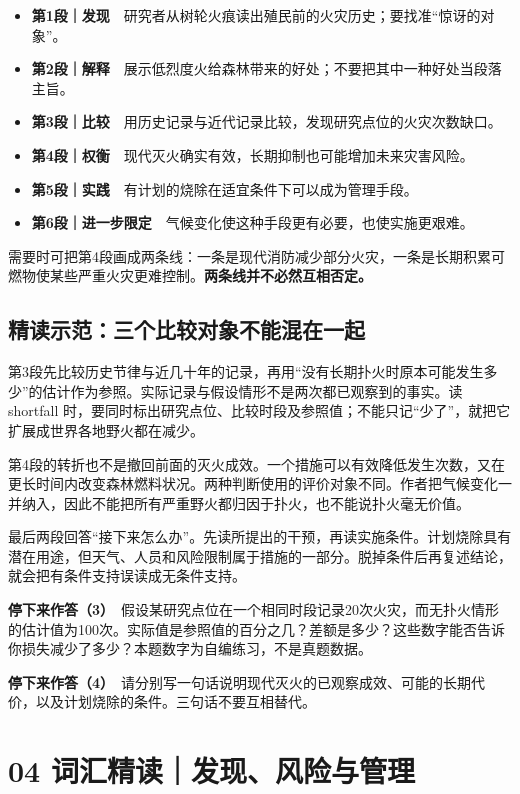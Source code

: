 \documentclass[a4paper,11pt,openany]{report}
\providecommand{\tightlist}{\setlength{\itemsep}{1pt}\setlength{\parskip}{0pt}}
\begin{document}
\begin{itemize}
\tightlist
\item
  \textbf{第1段｜发现}　研究者从树轮火痕读出殖民前的火灾历史；要找准``惊讶的对象''。
\item
  \textbf{第2段｜解释}　展示低烈度火给森林带来的好处；不要把其中一种好处当段落主旨。
\item
  \textbf{第3段｜比较}　用历史记录与近代记录比较，发现研究点位的火灾次数缺口。
\item
  \textbf{第4段｜权衡}　现代灭火确实有效，长期抑制也可能增加未来灾害风险。
\item
  \textbf{第5段｜实践}　有计划的烧除在适宜条件下可以成为管理手段。
\item
  \textbf{第6段｜进一步限定}　气候变化使这种手段更有必要，也使实施更艰难。
\end{itemize}

需要时可把第4段画成两条线：一条是现代消防减少部分火灾，一条是长期积累可燃物使某些严重火灾更难控制。\textbf{两条线并不必然互相否定。}

\subsection{精读示范：三个比较对象不能混在一起}\label{ux7cbeux8bfbux793aux8303ux4e09ux4e2aux6bd4ux8f83ux5bf9ux8c61ux4e0dux80fdux6df7ux5728ux4e00ux8d77}

第3段先比较历史节律与近几十年的记录，再用``没有长期扑火时原本可能发生多少''的估计作为参照。实际记录与假设情形不是两次都已观察到的事实。读 shortfall 时，要同时标出研究点位、比较时段及参照值；不能只记``少了''，就把它扩展成世界各地野火都在减少。

第4段的转折也不是撤回前面的灭火成效。一个措施可以有效降低发生次数，又在更长时间内改变森林燃料状况。两种判断使用的评价对象不同。作者把气候变化一并纳入，因此不能把所有严重野火都归因于扑火，也不能说扑火毫无价值。

最后两段回答``接下来怎么办''。先读所提出的干预，再读实施条件。计划烧除具有潜在用途，但天气、人员和风险限制属于措施的一部分。脱掉条件后再复述结论，就会把有条件支持误读成无条件支持。

\textbf{停下来作答（3）}　假设某研究点位在一个相同时段记录20次火灾，而无扑火情形的估计值为100次。实际值是参照值的百分之几？差额是多少？这些数字能否告诉你损失减少了多少？本题数字为自编练习，不是真题数据。

\textbf{停下来作答（4）}　请分别写一句话说明现代灭火的已观察成效、可能的长期代价，以及计划烧除的条件。三句话不要互相替代。

\section{04 词汇精读｜发现、风险与管理}\label{ux8bcdux6c47ux7cbeux8bfbux53d1ux73b0ux98ceux9669ux4e0eux7ba1ux7406}
\end{document}

